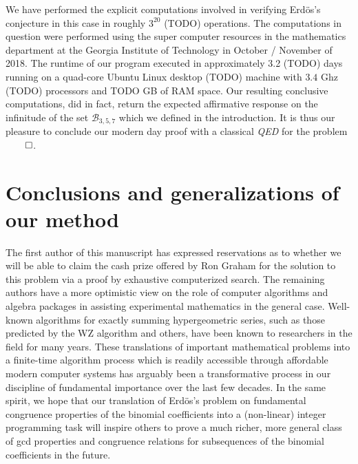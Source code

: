 \documentclass[12pt]{article}
\begin{document}
We have performed the explicit computations involved in verifying Erd\"os's conjecture in this case in 
roughly $3^{20}$ (TODO) operations. The computations in question were performed using the 
super computer resources in the mathematics department at the Georgia Institute of Technology in 
October / November of 2018. The runtime of our program executed in approximately 3.2 (TODO) days 
running on a quad-core Ubuntu Linux desktop (TODO) machine with $3.4$ Ghz (TODO) processors and 
TODO GB of RAM space. Our resulting 
conclusive computations, did in fact, return the expected affirmative response on the infinitude of the 
set $\mathcal{B}_{3,5,7}$ which we defined in the introduction. It is thus our pleasure to conclude our 
modern day proof with a classical \emph{QED} for the problem $\qed$. 

\section{Conclusions and generalizations of our method} 

The first author of this manuscript has expressed reservations as to whether we will be able to 
claim the cash prize offered by Ron Graham for the solution to this problem via a proof by 
exhaustive computerized search. The remaining authors have a more optimistic view on the role 
of computer algorithms and algebra packages in assisting experimental mathematics in the 
general case. Well-known algorithms for exactly summing hypergeometric series, such as those 
predicted by the WZ algorithm and others, have been known to researchers in the field for many years. 
These translations of important mathematical problems into a finite-time algorithm process which is 
readily accessible through affordable modern computer systems has arguably been a transformative 
process in our discipline of fundamental importance over the last few decades. In the same spirit, 
we hope that our translation of Erd\"os's problem on fundamental congruence properties of the 
binomial coefficients into a (non-linear) integer programming task will inspire others to prove a 
much richer, more general class of gcd properties and congruence relations for subsequences of the 
binomial coefficients in the future. 
\end{document}
